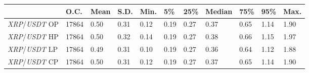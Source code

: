 \begin{tabular}{lllllllllll}
\toprule
 & \textbf{O.C.} & \textbf{Mean} & \textbf{S.D.} & \textbf{Min.} & \textbf{5\%} & \textbf{25\%} & \textbf{Median} & \textbf{75\%} & \textbf{95\%} & \textbf{Max.} \\
\midrule
\emph{XRP}/\emph{USDT} OP & 17864 & 0.50 & 0.31 & 0.12 & 0.19 & 0.27 & 0.37 & 0.65 & 1.14 & 1.90 \\
\emph{XRP}/\emph{USDT} HP & 17864 & 0.50 & 0.32 & 0.14 & 0.19 & 0.27 & 0.38 & 0.66 & 1.15 & 1.97 \\
\emph{XRP}/\emph{USDT} LP & 17864 & 0.49 & 0.31 & 0.10 & 0.19 & 0.27 & 0.36 & 0.64 & 1.12 & 1.88 \\
\emph{XRP}/\emph{USDT} CP & 17864 & 0.50 & 0.31 & 0.12 & 0.19 & 0.27 & 0.37 & 0.65 & 1.14 & 1.90 \\
\bottomrule
\end{tabular}
